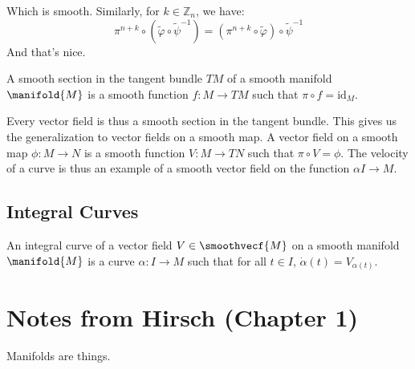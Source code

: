 \documentclass{article}                                                        %
\begin{document}
            Which is smooth. Similarly, for $k\in\mathbb{Z}_{n}$, we have:
            \begin{equation}
                \pi^{n+k}\circ(\tilde{\varphi}\circ\tilde{\psi}^{\minus{1}})
                =(\pi^{n+k}\circ\tilde{\varphi})\circ\tilde{\psi}^{\minus{1}}
            \end{equation}
            And that's nice.
            \begin{definition}
                A smooth section in the tangent bundle $TM$ of a smooth manifold
                $\manifold{M}$ is a smooth function $f:M\rightarrow{TM}$ such
                that $\pi\circ{f}=\textrm{id}_{M}$.
            \end{definition}
            Every vector field is thus a smooth section in the tangent bundle.
            This gives us the generalization to vector fields on a smooth map.
            A vector field on a smooth map $\phi:M\rightarrow{N}$ is a smooth
            function $V:M\rightarrow{TN}$ such that $\pi\circ{V}=\phi$. The
            velocity of a curve is thus an example of a smooth vector field on
            the function $\alpha{I}\rightarrow{M}$.
        \subsection{Integral Curves}
            \begin{definition}
                An integral curve of a vector field $V\in\smoothvecf{M}$ on a
                smooth manifold $\manifold{M}$ is a curve
                $\alpha:I\rightarrow{M}$ such that for all $t\in{I}$,
                $\dot{\alpha}(t)=V_{\alpha(t)}$.
            \end{definition}
    \section{Notes from Hirsch (Chapter 1)}
        Manifolds are things.
\end{document}
